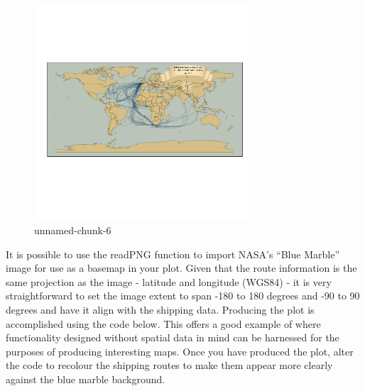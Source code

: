\documentclass[]{article}
\let\Oldincludegraphics\includegraphics
\renewcommand{\includegraphics}[1]{\Oldincludegraphics[width=8cm]{#1}}
\begin{document}
\begin{figure}[htbp]
\centering
\includegraphics{figure/unnamed-chunk-6.png}
\caption{unnamed-chunk-6}
\end{figure}

It is possible to use the readPNG function to import NASA's ``Blue
Marble'' image for use as a basemap in your plot. Given that the route
information is the same projection as the image - latitude and longitude
(WGS84) - it is very straightforward to set the image extent to span
-180 to 180 degrees and -90 to 90 degrees and have it align with the
shipping data. Producing the plot is accomplished using the code below.
This offers a good example of where functionality designed without
spatial data in mind can be harnessed for the purposes of producing
interesting maps. Once you have produced the plot, alter the code to
recolour the shipping routes to make them appear more clearly against
the blue marble background.
\end{document}
